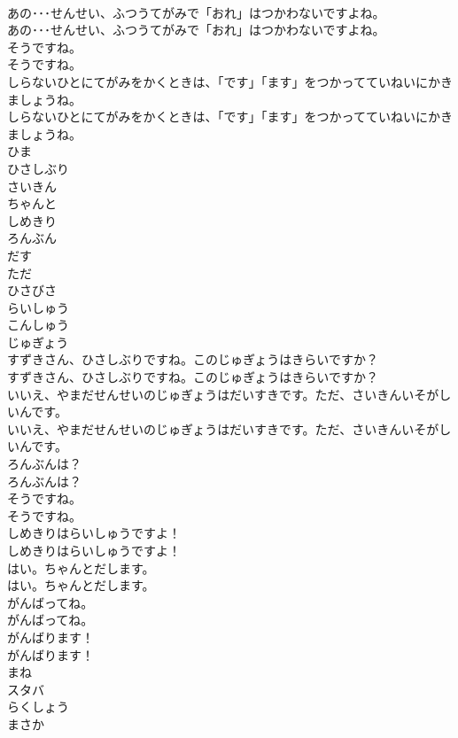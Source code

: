 \documentclass[8pt]{extreport}
\begin{document}
\begin{CJK}{UTF8}{min}
\\	あの･･･せんせい、ふつうてがみで「おれ」はつかわないですよね。
\\	あの･･･せんせい、ふつうてがみで「おれ」はつかわないですよね。
\\	そうですね。
\\	そうですね。
\\	しらないひとにてがみをかくときは、「です」「ます」をつかってていねいにかきましょうね。
\\	しらないひとにてがみをかくときは、「です」「ます」をつかってていねいにかきましょうね。
\\	ひま
\\	ひさしぶり
\\	さいきん
\\	ちゃんと
\\	しめきり
\\	ろんぶん
\\	だす
\\	ただ
\\	ひさびさ
\\	らいしゅう
\\	こんしゅう
\\	じゅぎょう
\\	すずきさん、ひさしぶりですね。このじゅぎょうはきらいですか？
\\	すずきさん、ひさしぶりですね。このじゅぎょうはきらいですか？
\\	いいえ、やまだせんせいのじゅぎょうはだいすきです。ただ、さいきんいそがしいんです。
\\	いいえ、やまだせんせいのじゅぎょうはだいすきです。ただ、さいきんいそがしいんです。
\\	ろんぶんは？
\\	ろんぶんは？
\\	そうですね。
\\	そうですね。
\\	しめきりはらいしゅうですよ！
\\	しめきりはらいしゅうですよ！
\\	はい。ちゃんとだします。
\\	はい。ちゃんとだします。
\\	がんばってね。
\\	がんばってね。
\\	がんばります！
\\	がんばります！
\\	まね
\\	スタバ
\\	らくしょう
\\	まさか

\end{CJK}
\end{document}
